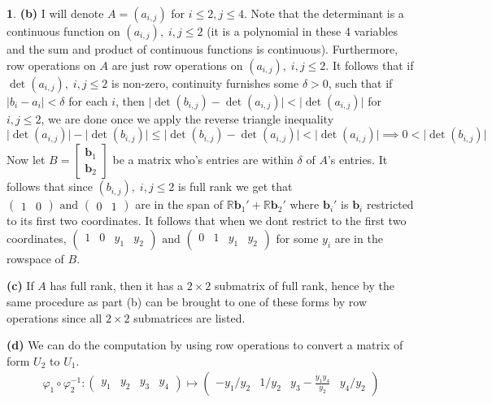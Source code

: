 \documentclass[10.5pt]{article}
\theoremstyle{definition}
\newtheorem{pb}{}
\newcommand{\abs}[1]{\lvert#1\rvert}
\newcommand{\tand}{\text{ and }}
\begin{document}
\begin{pb}
    \textbf{(b)} 
    I will denote \(A = (a_{i,j})\) for \(i \leq 2, j \leq 4\). Note that the determinant is a continuous function on \((a_{i,j}), \; i,j \leq 2\) 
    (it is a polynomial in these 4 variables and the sum and product of continuous functions is continuous).
    Furthermore, row operations on \(A\) are just row operations on \((a_{i,j}), \; i,j \leq 2\). It follows that if \(\det (a_{i,j}), \; i,j \leq 2\) is non-zero, continuity furnishes some \(\delta > 0\), such that
    if \(\abs{b_i - a_i} < \delta\) for each \(i\), then \(\abs{\det (b_{i,j}) - \det (a_{i,j})} < \abs{\det (a_{i,j})}\) for \(i,j \leq 2\), we are done once we apply the reverse triangle inequality
    \[\abs{\det (a_{i,j})} - \abs{\det (b_{i,j})} \leq \abs{\det (b_{i,j}) - \det (a_{i,j})} < \abs{\det (a_{i,j})} \implies 0 < \abs{\det (b_{i,j})}\]
    Now let \(B = \begin{bmatrix}
        \mathbf{b}_1 \\
        \mathbf{b}_2
    \end{bmatrix}\) be a matrix who's entries are within \(\delta\) of \(A\)'s entries. It follows that since \((b_{i,j}), \; i,j \leq 2\) is full rank
    we get that \(\begin{pmatrix}
        1 & 0
    \end{pmatrix} \tand \begin{pmatrix}
        0 & 1
    \end{pmatrix}\) are in the span of \(\mathbb{R} \mathbf{b}_1' + \mathbb{R} \mathbf{b}_2'\) where \(\mathbf{b}_i'\) is \(\mathbf{b}_i\) restricted to its first two coordinates.
    It follows that when we dont restrict to the first two coordinates,
    \(\begin{pmatrix}
        1 & 0 &y_1&y_2
    \end{pmatrix} \tand \begin{pmatrix}
        0 & 1 &y_1&y_2
    \end{pmatrix}\) for some \(y_i\) are in the rowspace of \(B\).

    \textbf{(c)} If \(A\) has full rank, then it has a \(2 \times 2\) submatrix of full rank, hence by the same procedure as part (b) can be brought
    to one of these forms by row operations since all \(2 \times 2\) submatrices are listed.

    \textbf{(d)} We can do the computation by using row operations to convert a matrix of form \(U_2\) to \(U_1\).
    \begin{align*}
        \varphi_1 \circ \varphi_2^{-1}:
            \begin{pmatrix}
                y_1 & y_2 & y_3 & y_4
            \end{pmatrix}
            \mapsto \begin{pmatrix}
                -y_1/y_2 & 1/y_2 & y_3 - \frac{y_1y_4}{y_2} & y_4/y_2
            \end{pmatrix}
    \end{align*}
\end{pb}
\end{document}
